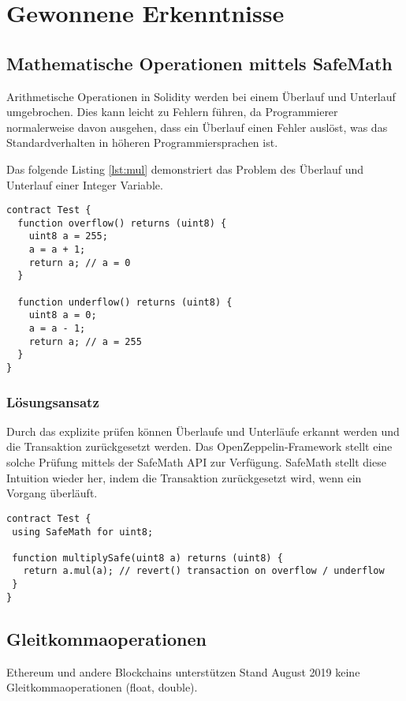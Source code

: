 \section{Gewonnene Erkenntnisse}


\subsection{Mathematische Operationen mittels SafeMath}
Arithmetische Operationen in Solidity werden bei einem Überlauf und Unterlauf umgebrochen. Dies kann leicht zu Fehlern führen, da Programmierer normalerweise davon ausgehen, dass ein Überlauf einen Fehler auslöst, was das Standardverhalten in höheren Programmiersprachen ist.

Das folgende Listing \ref{lst:mul} demonstriert das Problem des Überlauf und Unterlauf einer Integer Variable.

\begin{lstlisting}[caption={Beispielhafter Überlauf und Unterlauf},captionpos=b,label=lst:mul]
contract Test {
  function overflow() returns (uint8) {
    uint8 a = 255;
    a = a + 1;  	
    return a; // a = 0
  }
  
  function underflow() returns (uint8) {
    uint8 a = 0;
    a = a - 1;  	
    return a; // a = 255
  }
}
\end{lstlisting}

\subsubsection*{Lösungsansatz}
Durch das explizite prüfen können Überlaufe und Unterläufe erkannt werden und die Transaktion zurückgesetzt werden. Das OpenZeppelin-Framework stellt eine solche Prüfung mittels der SafeMath API zur Verfügung. SafeMath stellt diese Intuition wieder her, indem die Transaktion zurückgesetzt wird, wenn ein Vorgang überläuft. \cite{safemath}

\begin{lstlisting}[caption={Beispielhafte Multiplikation mittels SafeMath zurück},captionpos=b,label=lst:mulsafe]
contract Test {
 using SafeMath for uint8;

 function multiplySafe(uint8 a) returns (uint8) {
   return a.mul(a); // revert() transaction on overflow / underflow
 }
}
\end{lstlisting}


\subsection{Gleitkommaoperationen}
Ethereum und andere Blockchains unterstützen Stand August 2019 keine Gleitkommaoperationen (float, double).


